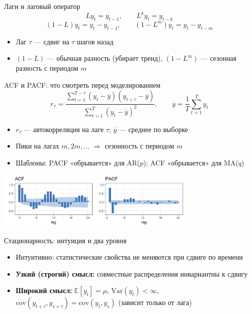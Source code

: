 \documentclass[aspectratio=1610,12pt]{beamer}
\begin{document}
\begin{frame}{Лаги и лаговый оператор}
\[
Ly_t = y_{t-1}, \qquad L^k y_t = y_{t-k}
\]
\[
(1-L)y_t = y_t - y_{t-1}, \qquad (1-L^m)y_t = y_t - y_{t-m}
\]
\begin{itemize}
  \item Лаг $\tau$ — сдвиг на $\tau$ шагов назад
  \item $(1-L)$ — обычная разность (убирает тренд), $(1-L^m)$ — сезонная разность с периодом $m$
\end{itemize}
\end{frame}

\begin{frame}{ACF и PACF: что смотреть перед моделированием}
\small
\[
r_\tau=\frac{\sum_{t=1}^{T-\tau}(y_t-\overline y)(y_{t+\tau}-\overline y)}{\sum_{t=1}^T (y_t-\overline y)^2},
\qquad
\overline y=\frac{1}{T}\sum_{t=1}^T y_t
\]
\begin{itemize}
  \item $r_\tau$ — автокорреляция на лаге $\tau$;\; $\overline y$ — среднее по выборке
  \item Пики на лагах $m,2m,\dots$ $\Rightarrow$ сезонность с периодом $m$
  \item Шаблоны: PACF «обрывается» для AR($p$);\; ACF «обрывается» для MA($q$)
\end{itemize}
\centering \includegraphics[width=0.72\textwidth]{acf_pacf_example.png}
\end{frame}

\begin{frame}{Стационарность: интуиция и два уровня}
\begin{itemize}
  \item Интуитивно: статистические свойства не меняются при сдвиге по времени
  \item \textbf{Узкий (строгий) смысл:} совместные распределения инвариантны к сдвигу
  \item \textbf{Широкий смысл:} $\mathbb{E}[y_t]=\mu$, $\mathrm{Var}(y_t)<\infty$,\\
  \hspace{1.15em}$\mathrm{cov}(y_{t+\tau},y_{s+\tau})=\mathrm{cov}(y_t,y_s)$ (зависит только от лага)
\end{itemize}
\end{frame}
\end{document}
